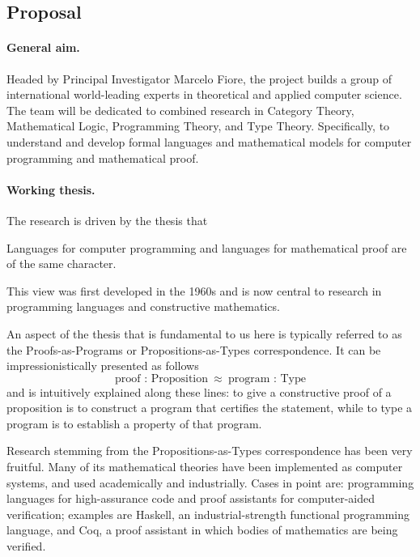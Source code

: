 \documentclass[11pt,twocolumn]{article}
\newenvironment{myquote}
  {\begin{list}{}
  {\setlength{\topsep}{2pt}
   \setlength{\partopsep}{2pt}
   \setlength{\itemsep}{2.5pt}
   \setlength{\parsep}{2.5pt}
   \setlength{\rightmargin}{1em}
   \setlength{\leftmargin}{1em}
   \setlength{\labelwidth}{.5em}}}
  {\end{list}}
\begin{document}
\clearpage
{}

\subsection{Proposal}
\label{Proposal}

\paragraph*{General aim.}

Headed by Principal Investigator Marcelo Fiore, the project builds a group
of international world-leading experts in theoretical and applied computer
science.  The team will be dedicated to combined research in Category
Theory, Mathematical Logic, Programming Theory, and Type Theory.
Specifically, to understand and develop formal languages and mathematical
models for computer programming and mathematical proof. 

\paragraph*{Working thesis.}

The research is driven by the thesis that
\begin{myquote}
\item
Languages for computer programming and languages for mathematical proof are of
the same character.
\end{myquote}
This view was first developed in the 1960s and is now central to research in
programming languages and constructive mathematics.

An aspect of the thesis that is fundamental to us here is typically referred
to as the Proofs-as-Programs or Propositions-as-Types correspondence.  It can
be impressionistically presented as follows
\[
  \mbox{proof : Proposition} 
  \enspace \approx \enspace 
  \mbox{program : Type} 
\]
and is intuitively explained along these lines: to give a constructive proof
of a proposition is to construct a program that certifies the statement, while
to type a program is to establish a property of that program.

Research stemming from the Propositions-as-Types correspondence has been very
fruitful.  Many of its mathematical theories have been implemented as computer
systems, and used academically and industrially.  Cases in point are:
programming languages for high-assurance code and proof assistants for
computer-aided verification; examples are Haskell, %
an industrial-strength functional programming language, and Coq, %
a proof assistant in which bodies of mathematics are being verified.
\end{document}
